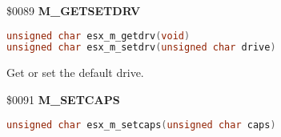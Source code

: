 \$0089 \textbf{M\_GETSETDRV}

\begin{lstlisting}[language=C]
unsigned char esx_m_getdrv(void)
unsigned char esx_m_setdrv(unsigned char drive)
\end{lstlisting}

Get or set the default drive.

%

\$0091 \textbf{M\_SETCAPS}

\begin{lstlisting}[language=C]
unsigned char esx_m_setcaps(unsigned char caps)
\end{lstlisting}

%

